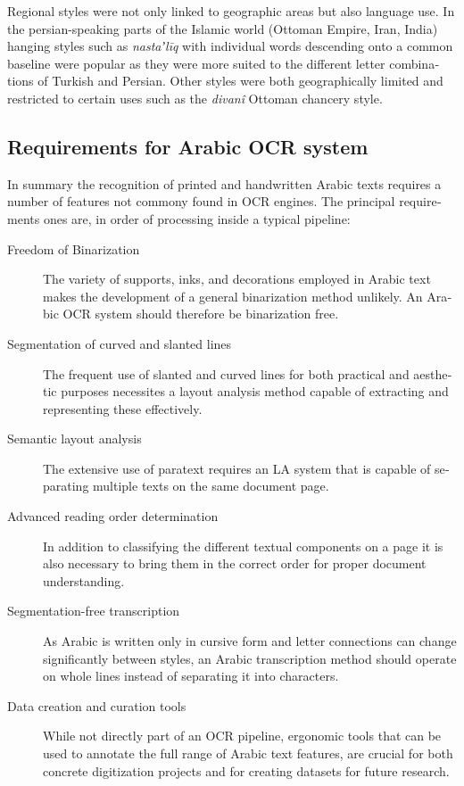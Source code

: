 \begin{french}
Regional styles were not only linked to geographic areas but also language use.
In the persian-speaking parts of the Islamic world (Ottoman Empire, Iran,
India) hanging styles such as \emph{nastaʼlīq} with individual words descending
onto a common baseline were popular as they were more suited to the different
letter combinations of Turkish and Persian. Other styles were both
geographically limited and restricted to certain uses such as the \emph{divanî}
Ottoman chancery style.

\subsection{Requirements for Arabic OCR system}

In summary the recognition of printed and handwritten Arabic texts requires a
number of features not commony found in OCR engines. The principal requirements
ones are, in order of processing inside a typical pipeline:

\begin{description}
	\item[Freedom of Binarization] The variety of supports, inks, and
		decorations employed in Arabic text makes the development of a
		general binarization method unlikely. An Arabic OCR system
		should therefore be binarization free.
	\item[Segmentation of curved and slanted lines] The frequent use of
		slanted and curved lines for both practical and aesthetic
		purposes necessites a layout analysis method capable of
		extracting and representing these effectively.
	\item[Semantic layout analysis] The extensive use of paratext requires
		an LA system that is capable of separating multiple texts on
		the same document page.
	\item[Advanced reading order determination] In addition to classifying
		the different textual components on a page it is also necessary
		to bring them in the correct order for proper document
		understanding.
	\item[Segmentation-free transcription] As Arabic is written only in
		cursive form and letter connections can change significantly
		between styles, an Arabic transcription method should operate
		on whole lines instead of separating it into characters.
	\item[Data creation and curation tools] While not directly part of an
		OCR pipeline, ergonomic tools that can be used to annotate the
		full range of Arabic text features, are crucial for both
		concrete digitization projects and for creating datasets for
		future research.
\end{description}


\end{french}
